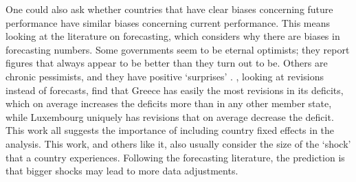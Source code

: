\documentclass[]{article}
\begin{document}
One could also ask whether countries that have clear biases concerning future performance have similar biases concerning current performance. This means looking at the literature on forecasting, which  considers why there are biases in forecasting numbers. Some governments seem to be eternal optimists; they report figures that always appear to be better than they turn out to be. Others are chronic pessimists, and they have positive `surprises' \citep[e.g.][]{Strauchetal2004}. \cite{DeCastro2013}, looking at revisions instead of forecasts, find that Greece has easily the most revisions in its deficits, which on average increases the deficits more than in any other member state, while Luxembourg uniquely has revisions that on average decrease the deficit. This work all suggests the importance of including country fixed effects in the analysis.  This work, and others like it, also usually consider the size of the `shock' that a country experiences. Following the forecasting literature, the prediction is that bigger shocks may lead to more data adjustments.

\end{document}
